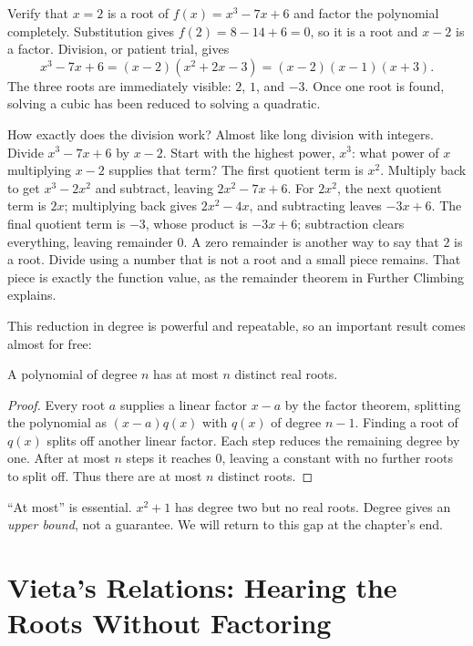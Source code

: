 \begin{li}
Verify that $x=2$ is a root of $f(x)=x^3-7x+6$ and factor the polynomial completely. Substitution gives $f(2)=8-14+6=0$, so it is a root and $x-2$ is a factor. Division, or patient trial, gives
\[
x^3-7x+6 = (x-2)(x^2+2x-3) = (x-2)(x-1)(x+3).
\]
The three roots are immediately visible: $2$, $1$, and $-3$. Once one root is found, solving a cubic has been reduced to solving a quadratic.
\end{li}

How exactly does the division work? Almost like long division with integers. Divide $x^3-7x+6$ by $x-2$. Start with the highest power, $x^3$: what power of $x$ multiplying $x-2$ supplies that term? The first quotient term is $x^2$. Multiply back to get $x^3-2x^2$ and subtract, leaving $2x^2-7x+6$. For $2x^2$, the next quotient term is $2x$; multiplying back gives $2x^2-4x$, and subtracting leaves $-3x+6$. The final quotient term is $-3$, whose product is $-3x+6$; subtraction clears everything, leaving remainder $0$. A zero remainder is another way to say that $2$ is a root. Divide using a number that is not a root and a small piece remains. That piece is exactly the function value, as the remainder theorem in Further Climbing explains.

This reduction in degree is powerful and repeatable, so an important result comes almost for free:

\begin{tuilun}
A polynomial of degree $n$ has at most $n$ distinct real roots.
\end{tuilun}

\begin{proof}
Every root $a$ supplies a linear factor $x-a$ by the factor theorem, splitting the polynomial as $(x-a)q(x)$ with $q(x)$ of degree $n-1$. Finding a root of $q(x)$ splits off another linear factor. Each step reduces the remaining degree by one. After at most $n$ steps it reaches $0$, leaving a constant with no further roots to split off. Thus there are at most $n$ distinct roots.
\end{proof}

\begin{zhu}
``At most'' is essential. $x^2+1$ has degree two but no real roots. Degree gives an \emph{upper bound}, not a guarantee. We will return to this gap at the chapter's end.
\end{zhu}

\section{Vieta's Relations: Hearing the Roots Without Factoring}

